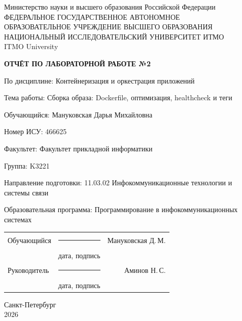\documentclass[14pt,a4paper,oneside]{extreport}
\newcommand{\LabNumber}{2}
\newcommand{\LabTitle}{Сборка образа: Dockerfile, оптимизация, healthcheck и теги}
\newcommand{\CourseName}{Контейнеризация и оркестрация приложений}
\newcommand{\StudentName}{Мануковская Дарья Михайловна}
\newcommand{\StudentShortName}{Мануковская Д.\,М.}
\newcommand{\StudentISU}{466625}
\newcommand{\StudentGroup}{K3221}
\newcommand{\FacultyName}{Факультет прикладной информатики}
\newcommand{\DegreeProgramme}{11.03.02 Инфокоммуникационные технологии и
системы связи}
\newcommand{\EducationProgramme}{Программирование в
инфокоммуникационных системах}
\newcommand{\TeacherName}{Аминов Н.\,С.}
\newcommand{\ReportCity}{Санкт-Петербург}
\newcommand{\ReportYear}{2026}
\begin{document}
\begin{titlepage}
  \thispagestyle{empty}
  \begin{center}
    \fontsize{12pt}{16pt}\selectfont
    Министерство науки и высшего образования Российской Федерации\\[0.25\baselineskip]
    ФЕДЕРАЛЬНОЕ ГОСУДАРСТВЕННОЕ АВТОНОМНОЕ\\
    ОБРАЗОВАТЕЛЬНОЕ УЧРЕЖДЕНИЕ ВЫСШЕГО ОБРАЗОВАНИЯ\\[0.25\baselineskip]
    НАЦИОНАЛЬНЫЙ ИССЛЕДОВАТЕЛЬСКИЙ УНИВЕРСИТЕТ ИТМО\\
    ITMO University
  \end{center}
  \vspace{0.8\baselineskip}
  \begin{center}
    \textbf{ОТЧЁТ ПО ЛАБОРАТОРНОЙ РАБОТЕ №\LabNumber}
  \end{center}
  \vspace{0.4\baselineskip}
  \begingroup
  \setlength{\parindent}{0pt}
  По дисциплине: \CourseName\par\medskip
  Тема работы: \LabTitle\par\medskip
  Обучающийся: \StudentName\par\medskip
  Номер ИСУ: \StudentISU\par\medskip
  Факультет: \FacultyName\par\medskip
  Группа: \StudentGroup\par\medskip
  Направление подготовки: \DegreeProgramme\par\medskip
  Образовательная программа: \EducationProgramme\par
  \endgroup
  \vfill
  \begin{tabularx}{\textwidth}{@{}l>{\centering\arraybackslash}Xr@{}}
    Обучающийся & \rule{25mm}{0.4pt} & \StudentShortName\\
    & {\fontsize{12pt}{14pt}\selectfont дата, подпись} &\\[0.4\baselineskip]
    Руководитель & \rule{25mm}{0.4pt} & \TeacherName\\
    & {\fontsize{12pt}{14pt}\selectfont дата, подпись} &
  \end{tabularx}
  \vfill
  \begin{center}
    \ReportCity\\
    \ReportYear
  \end{center}
\end{titlepage}
\setcounter{page}{2}
\tableofcontents

\end{document}
